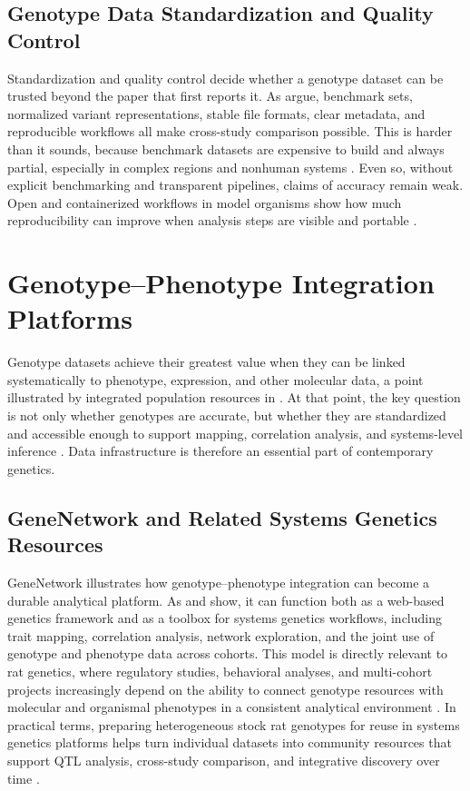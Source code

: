 \documentclass{article}
\begin{document}
\subsection{Genotype Data Standardization and Quality Control}
Standardization and quality control decide whether a genotype dataset can be trusted beyond the paper that first reports it. As \textcite{majidian2023genomic} argue, benchmark sets, normalized variant representations, stable file formats, clear metadata, and reproducible workflows all make cross-study comparison possible. This is harder than it sounds, because benchmark datasets are expensive to build and always partial, especially in complex regions and nonhuman systems \parencite{barbitoff2022systematic}. Even so, without explicit benchmarking and transparent pipelines, claims of accuracy remain weak. Open and containerized workflows in model organisms show how much reproducibility can improve when analysis steps are visible and portable \parencite{ellison2020mutanthuntwgs,vedi20232022,de2024revamped}.

\section{Genotype--Phenotype Integration Platforms}
Genotype datasets achieve their greatest value when they can be linked systematically to phenotype, expression, and other molecular data, a point illustrated by integrated population resources in \textcite{zinski2021genome}. At that point, the key question is not only whether genotypes are accurate, but whether they are standardized and accessible enough to support mapping, correlation analysis, and systems-level inference \parencite{vedi20232022,carrette2021cocaine}. Data infrastructure is therefore an essential part of contemporary genetics.

\subsection{GeneNetwork and Related Systems Genetics Resources}
GeneNetwork illustrates how genotype--phenotype integration can become a durable analytical platform. As \textcite{sloan2016genenetwork} and \textcite{mulligan2017genenetwork} show, it can function both as a web-based genetics framework and as a toolbox for systems genetics workflows, including trait mapping, correlation analysis, network exploration, and the joint use of genotype and phenotype data across cohorts. This model is directly relevant to rat genetics, where regulatory studies, behavioral analyses, and multi-cohort projects increasingly depend on the ability to connect genotype resources with molecular and organismal phenotypes in a consistent analytical environment \parencite{munro2022regulatory,kuhn2025genome,tonnele2025genetic}. In practical terms, preparing heterogeneous stock rat genotypes for reuse in systems genetics platforms helps turn individual datasets into community resources that support QTL analysis, cross-study comparison, and integrative discovery over time \parencite{johnson2023rattaca,vedi20232022,carrette2021cocaine}.
\end{document}
